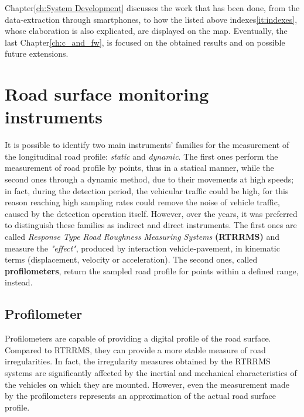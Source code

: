 \documentclass[tesi]{subfiles}
\begin{document}
Chapter\ref{ch:System Development} discusses the work that has been done, from the data-extraction through smartphones, to how the listed above indexes\ref{it:indexes}, whose elaboration is also explicated, are displayed on the map.
Eventually, the last Chapter\ref{ch:c_and_fw}, is focused on the obtained results and on possible future extensions.

	\section{Road surface monitoring instruments}\label{sc:Instruments}
It is possible to identify two main instruments' families for the measurement of the longitudinal road profile: \emph{static} and \emph{dynamic}. The first ones perform the measurement of road profile by points, thus in a statical manner, while the second ones through a dynamic method, due to their movements at high speeds; in fact, during the detection period, the vehicular traffic could be high, for this reason reaching high sampling rates could remove the noise of vehicle traffic, caused by the detection operation itself. However, over the years, it was preferred to distinguish these families as indirect and direct instruments.
The first ones are called \textit{Response Type Road Roughness Measuring Systems} \textbf{(RTRRMS)} and measure the \textit{"effect"}, produced by interaction vehicle-pavement, in kinematic terms (displacement, velocity or acceleration). The second ones, called \textbf{profilometers}, return the sampled road profile for points within a defined range, instead.

		\subsection{Profilometer}\label{ssc:profilometers}
Profilometers are capable of providing a digital profile of the road surface. Compared to RTRRMS, they can provide a more stable measure of road irregularities. In fact, the irregularity measures obtained by the RTRRMS systems are significantly affected by the inertial and mechanical characteristics of the vehicles on which they are mounted. However, even the measurement made by the profilometers represents an approximation of the actual road surface profile\cite{sayers1996interpretation}.
\end{document}

